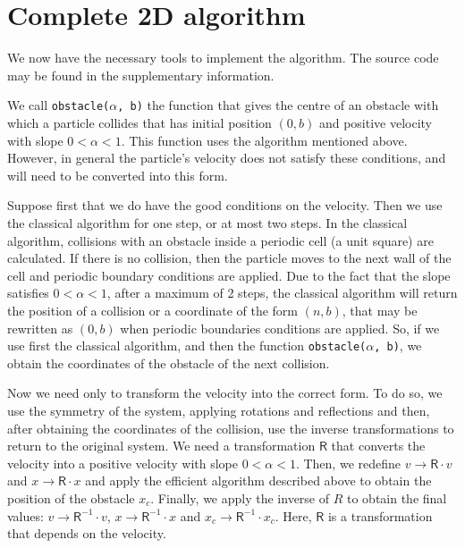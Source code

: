 \documentclass{iopart}
\begin{document}
\section{Complete 2D algorithm}

We now have the necessary tools to implement the algorithm. The source code may be found in the supplementary information.

We call \texttt{obstacle($\alpha$, b)} the function that gives the centre of an obstacle with which a particle collides that has initial position $(0,b)$ and positive velocity with slope 
$0 < \alpha <1$. This function uses the algorithm mentioned above. However, in general the particle's velocity does not satisfy these conditions, and will need to be converted into this form.

Suppose first that we do have the good conditions on the velocity. Then we use the classical algorithm for one step, or at most two steps. In the classical algorithm, collisions with an obstacle inside a periodic cell (a unit square) are calculated. If there is no collision, then the particle moves to the next wall of the cell and periodic boundary conditions are applied. Due to  the fact that the slope satisfies $0 < \alpha < 1$, after a maximum of 2 steps, the classical algorithm will return the position of a collision or a coordinate of the form $(n,b)$, that may be rewritten as $(0,b)$ when periodic boundaries conditions are applied. So, if we use first the classical algorithm, and then the function \texttt{obstacle($\alpha$, b)}, we obtain the coordinates of the obstacle of the next collision.  


Now we need only to transform the velocity into the correct form. To do so, we use the symmetry of the system, applying rotations and reflections and then, after obtaining the coordinates of the collision, use the inverse transformations to return to the original system. 
We need a transformation $\mathsf{R}$ that converts the velocity into a positive velocity with slope $0<\alpha<1$. Then, we redefine $v \rightarrow \mathsf{R} \cdot v$ and $x \rightarrow \mathsf{R} \cdot x$ and  apply the efficient algorithm described above to obtain the position of the obstacle $x_c$. Finally, we apply the inverse of $R$ to obtain the final values:  $v \rightarrow \mathsf{R}^{-1} \cdot v$, $x \rightarrow \mathsf{R}^{-1} \cdot x$ and $x_c \rightarrow \mathsf{R}^{-1} \cdot x_c$. Here, $\mathsf{R}$ is a transformation that depends on the velocity. 
\end{document}
